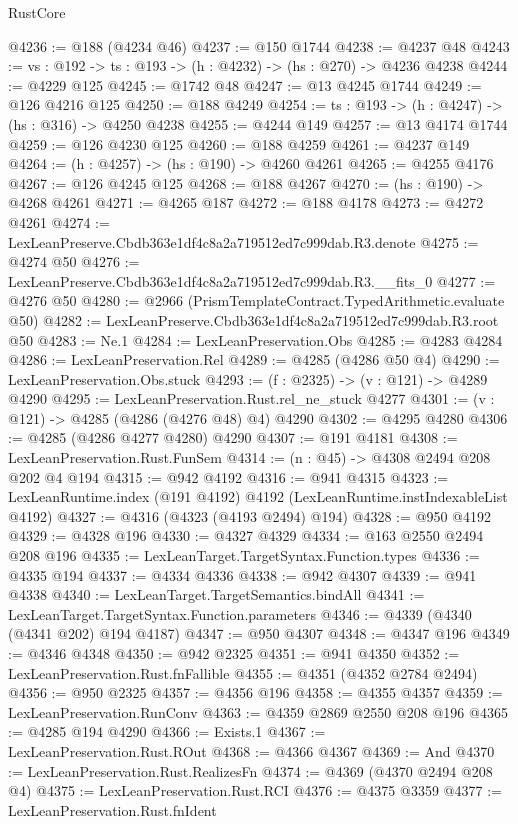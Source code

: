 \begin{lexlean}{RustCore}
\begin{coremodule}
@4236 := @188 (@4234 @46)
@4237 := @150 @1744
@4238 := @4237 @48
@4243 := {vs : @192} -> {ts : @193} -> (h : @4232) -> (hs : @270) -> @4236 @4238
@4244 := @4229 @125
@4245 := @1742 @48
@4247 := @13 @4245 @1744
@4249 := @126 @4216 @125
@4250 := @188 @4249
@4254 := {ts : @193} -> (h : @4247) -> (hs : @316) -> @4250 @4238
@4255 := @4244 @149
@4257 := @13 @4174 @1744
@4259 := @126 @4230 @125
@4260 := @188 @4259
@4261 := @4237 @149
@4264 := (h : @4257) -> (hs : @190) -> @4260 @4261
@4265 := @4255 @4176
@4267 := @126 @4245 @125
@4268 := @188 @4267
@4270 := (hs : @190) -> @4268 @4261
@4271 := @4265 @187
@4272 := @188 @4178
@4273 := @4272 @4261
@4274 := LexLeanPreserve.Cbdb363e1df4c8a2a719512ed7c999dab.R3.denote
@4275 := @4274 @50
@4276 := LexLeanPreserve.Cbdb363e1df4c8a2a719512ed7c999dab.R3.__fits_0
@4277 := @4276 @50
@4280 := @2966 (PrismTemplateContract.TypedArithmetic.evaluate @50)
@4282 := LexLeanPreserve.Cbdb363e1df4c8a2a719512ed7c999dab.R3.root @50
@4283 := Ne.{1}
@4284 := LexLeanPreservation.Obs
@4285 := @4283 @4284
@4286 := LexLeanPreservation.Rel
@4289 := @4285 (@4286 @50 @4)
@4290 := LexLeanPreservation.Obs.stuck
@4293 := (f : @2325) -> (v : @121) -> @4289 @4290
@4295 := LexLeanPreservation.Rust.rel_ne_stuck @4277
@4301 := (v : @121) -> @4285 (@4286 (@4276 @48) @4) @4290
@4302 := @4295 @4280
@4306 := @4285 (@4286 @4277 @4280) @4290
@4307 := @191 @4181
@4308 := LexLeanPreservation.Rust.FunSem
@4314 := (n : @45) -> @4308 @2494 @208 @202 @4 @194
@4315 := @942 @4192
@4316 := @941 @4315
@4323 := LexLeanRuntime.index (@191 @4192) @4192 (LexLeanRuntime.instIndexableList @4192)
@4327 := @4316 (@4323 (@4193 @2494) @194)
@4328 := @950 @4192
@4329 := @4328 @196
@4330 := @4327 @4329
@4334 := @163 @2550 @2494 @208 @196
@4335 := LexLeanTarget.TargetSyntax.Function.types
@4336 := @4335 @194
@4337 := @4334 @4336
@4338 := @942 @4307
@4339 := @941 @4338
@4340 := LexLeanTarget.TargetSemantics.bindAll
@4341 := LexLeanTarget.TargetSyntax.Function.parameters
@4346 := @4339 (@4340 (@4341 @202) @194 @4187)
@4347 := @950 @4307
@4348 := @4347 @196
@4349 := @4346 @4348
@4350 := @942 @2325
@4351 := @941 @4350
@4352 := LexLeanPreservation.Rust.fnFallible
@4355 := @4351 (@4352 @2784 @2494)
@4356 := @950 @2325
@4357 := @4356 @196
@4358 := @4355 @4357
@4359 := LexLeanPreservation.RunConv
@4363 := @4359 @2869 @2550 @208 @196
@4365 := @4285 @194 @4290
@4366 := Exists.{1}
@4367 := LexLeanPreservation.Rust.ROut
@4368 := @4366 @4367
@4369 := And
@4370 := LexLeanPreservation.Rust.RealizesFn
@4374 := @4369 (@4370 @2494 @208 @4)
@4375 := LexLeanPreservation.Rust.RCI
@4376 := @4375 @3359
@4377 := LexLeanPreservation.Rust.fnIdent

\end{coremodule}
\end{lexlean}
